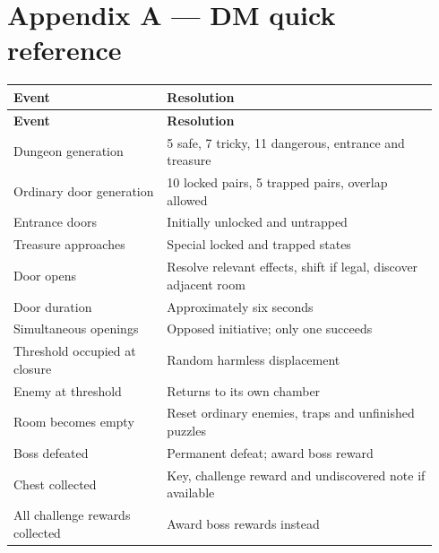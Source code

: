 \section{Appendix A — DM quick reference}

\begin{longtable}{p{0.34\linewidth}p{0.6\linewidth}}

\rowcolor{tablehead} \textbf{Event} & \textbf{Resolution} \\

\endfirsthead

\rowcolor{tablehead} \textbf{Event} & \textbf{Resolution} \\

\endhead

Dungeon generation & 5 safe, 7 tricky, 11 dangerous, entrance and treasure \\

Ordinary door generation & 10 locked pairs, 5 trapped pairs, overlap allowed \\

Entrance doors & Initially unlocked and untrapped \\

Treasure approaches & Special locked and trapped states \\

Door opens & Resolve relevant effects, shift if legal, discover adjacent room \\

Door duration & Approximately six seconds \\

Simultaneous openings & Opposed initiative; only one succeeds \\

Threshold occupied at closure & Random harmless displacement \\

Enemy at threshold & Returns to its own chamber \\

Room becomes empty & Reset ordinary enemies, traps and unfinished puzzles \\

Boss defeated & Permanent defeat; award boss reward \\

Chest collected & Key, challenge reward and undiscovered note if available \\

All challenge rewards collected & Award boss rewards instead \\


\end{longtable}

